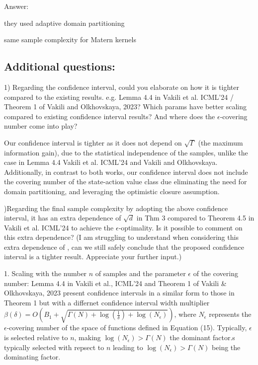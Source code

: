 \documentclass{article}
\begin{document}
Answer: 

they used adaptive domain partitioning 

same sample complexity for Matern kernels


\subsection{Additional questions:}

1) Regarding the confidence interval, could you elaborate on how it is tighter compared to the existing results. e.g. Lemma 4.4 in Vakili et al. ICML'24 / Theorem 1 of Vakili and Olkhovskaya, 2023? Which params have better scaling compared to existing confidence interval results? And where does the $\epsilon$-covering number come into play?

Our confidence interval is tighter as it does not depend on  $\sqrt{\Gamma}$ (the maximum information gain), due to the statistical independence of the samples, unlike the case in Lemma 4.4 Vakili et al. ICML'24 and Vakili and Olkhovskaya. Additionally, in contrast to both works, our confidence interval does not include the covering number of the state-action value class due eliminating the need for domain partitioning, and leveraging the optimistic closure assumption. 


)Regarding the final sample complexity by adopting the above confidence interval, it has an extra dependence of 
 $\sqrt{d}$ in Thm 3 compared to Theorem 4.5 in Vakili et al. ICML'24 to achieve the $\epsilon$-optimality. Is it possible to comment on this extra dependence? (I am struggling to understand when considering this extra dependence of 
, can we still safely conclude that the proposed confidence interval is a tighter result. Appreciate your further input.)

1. Scaling with the number $n$ of samples and the parameter $\epsilon$ of the covering number: Lemma 4.4 in Vakili et al., ICML'24 and Theorem 1 of Vakili & Olkhovskaya, 2023 present confidence intervals in a similar form to those in Theorem 1 but with a differnet confidence interval width multiplier $\beta(\delta) = O( B_1 + \sqrt{\Gamma(N)+\log(\frac{1}{\delta}) + \log(N_{\epsilon})})$, where $N_{\epsilon}$ represents the $\epsilon$-covering number of the space of functions defined in Equation (15). Typically, $\epsilon$ is selected relative to $n$, making $\log(N_{\epsilon}) > \Gamma(N)$ the dominant factor.s typically selected with repsect to $n$ leading to $\log(N_{\epsilon}) > \Gamma(N)$ being the dominating factor.








\end{document}
